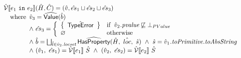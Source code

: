 \[\begin{array}{l}
\aV \lbr e_1 ~\verb+in+~ e_2 \rbr (\hat{H}, \hat{C}) = (\hat{v}, \hat{es}_1 \sqcup \hat{es}_2 \sqcup \hat{es}_3)\\
\quad\wherec{
\hat{v}_3 = \abs{Value}(\hat{b}) \\
\land\ \hat{es}_3 = \left \{ \begin{array}{ll}
\set{\hat{\exc{TypeError}}} & \ifc{\hat{v}_2\emph{.pvalue} \not\sqsubseteq \bot_{PValue}} \\
\varnothing & \owc \\
\end{array} \right. \\
\land\ \hat{b} = \bigsqcup_{\hat{l} \in \hat{v}_2\emph{.locset}} \abs{HasProperty}(\hat{H},\ \hat{loc},\ \hat{s}) \
\land\ \hat{s} = \hat{v}_1\emph{.toPrimitive.toAbsString} \\
\land\ (\hat{v}_1,\ \hat{es}_1) = \aV \lbr e_1 \rbr\ \hat{S} \
\land\ (\hat{v}_2,\ \hat{es}_2) = \aV \lbr e_2 \rbr\ \hat{S} \\
}\\\\

\end{array}
\]

